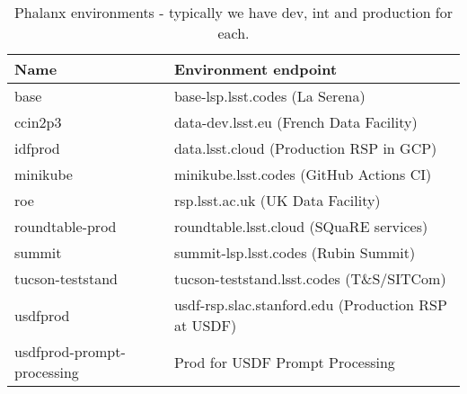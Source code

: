 \begin{longtable}{l|l}
\caption {Phalanx environments - typically we have dev, int and production for each.}\label{tab:envs}\\
\hline
\textbf{Name} & \textbf{Environment endpoint}  \\\hline
base & base-lsp.lsst.codes (La Serena) \\\hline
ccin2p3 & data-dev.lsst.eu (French Data Facility) \\\hline
idfprod & data.lsst.cloud (Production RSP in GCP) \\\hline
minikube & minikube.lsst.codes (GitHub Actions CI) \\\hline
roe & rsp.lsst.ac.uk (UK Data Facility) \\\hline
roundtable-prod & roundtable.lsst.cloud (SQuaRE services) \\\hline
summit & summit-lsp.lsst.codes (Rubin Summit) \\\hline
tucson-teststand & tucson-teststand.lsst.codes (T\&S/SITCom) \\\hline
usdfprod & usdf-rsp.slac.stanford.edu (Production RSP at USDF) \\\hline
usdfprod-prompt-processing & Prod for USDF Prompt Processing \\\hline
\end{longtable}
